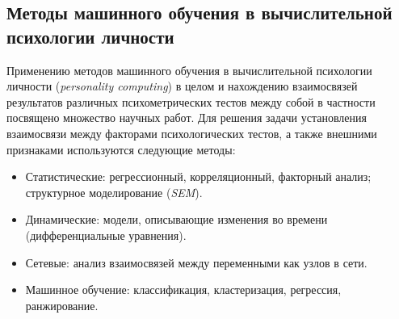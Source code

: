 \subsection{Методы машинного обучения в вычислительной психологии личности}

Применению методов машинного обучения в вычислительной психологии личности (\emph{personality computing}) в целом и нахождению взаимосвязей результатов различных психометрических тестов между собой в частности посвящено множество научных работ. Для решения задачи установления взаимосвязи между факторами психологических тестов, а также внешними признаками используются следующие методы:

\begin{itemize}[noitemsep, topsep=0pt, parsep=0pt, partopsep=0pt]
  \item Статистические: регрессионный, корреляционный, факторный анализ; структурное моделирование (\emph{SEM}).
  \item Динамические: модели, описывающие изменения во времени (дифференциальные уравнения).
  \item Сетевые: анализ взаимосвязей между переменными как узлов в сети.
  \item Машинное обучение: классификация, кластеризация, регрессия, ранжирование.
\end{itemize}

